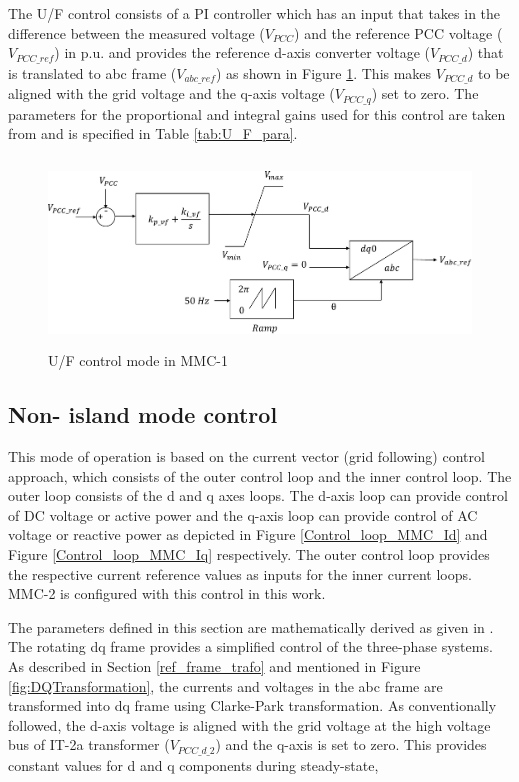 The U/F control consists of a \gls{PI} controller which has an input that takes in the difference between the measured voltage ($V_{PCC}$) and the reference \gls{PCC} voltage ($V_{PCC\_ref}$) in p.u. and provides the reference d-axis converter voltage ($V_{PCC\_d}$) that is translated to abc frame ($V_{abc\_ref}$) as shown in Figure \ref{fig:U_F_control}. This makes $V_{PCC\_d}$ to be aligned with the grid voltage and the q-axis voltage ($V_{PCC\_q}$) set to zero. The parameters for the proportional and integral gains used for this control are taken from \cite{vrana2013cigre} and is specified in Table \ref{tab:U_F_para}. 

\begin{figure}[H]
\centering
    \includegraphics[height = 5cm,width = 12.5cm]{Diagrams/Chapter_4/U_F_control.pdf}
    \caption{U/F control mode in MMC-1 \cite{vrana2013cigre}}
    \label{fig:U_F_control}
\end{figure}


\subsection{Non- island mode control}
This mode of operation is based on the current vector (grid following) control approach, which consists of the outer control loop and the inner control loop. The outer loop consists of the d and q axes loops. The d-axis loop can provide control of \gls{DC} voltage or active power and the q-axis loop can provide control of \gls{AC} voltage or reactive power as depicted in Figure \ref{Control_loop_MMC_Id} and Figure \ref{Control_loop_MMC_Iq} respectively. The outer control loop provides the respective current reference values as inputs for the inner current loops. \gls{MMC}-2 is configured with this control in this work. 

The parameters defined in this section are mathematically derived as given in \cite{saad2015modelisation}. The rotating dq frame provides a simplified control of the three-phase systems. As described in Section \ref{ref_frame_trafo} and mentioned in Figure \ref{fig:DQTransformation}, the currents and voltages in the abc frame are transformed into dq frame using Clarke-Park transformation.
As conventionally followed, the d-axis voltage is aligned with the grid voltage at the high voltage bus of IT-2a transformer ($V_{PCC\_d\_2}$) and the q-axis is set to zero. This provides constant values for d and q components during steady-state,


